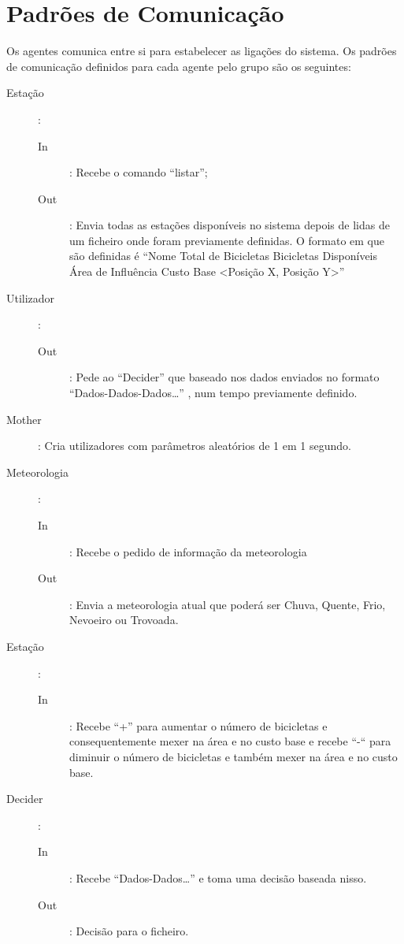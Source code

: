 \section{Padrões de Comunicação}\label{sec:comunicacao}

Os agentes comunica entre si para estabelecer as ligações do sistema. Os padrões de comunicação definidos para cada agente pelo grupo são os seguintes:

\begin{description}
\item [Estação]:
    \begin{description}
	\item[In]: Recebe o comando “listar”;
	\item[Out]: Envia todas as estações disponíveis no sistema depois de lidas de um ficheiro onde foram previamente definidas. O formato em que são definidas é “Nome Total de Bicicletas Bicicletas Disponíveis Área de Influência Custo Base <Posição X, Posição Y>”
	\end{description}

\item [Utilizador]:
    \begin{description}
	\item [Out]: Pede ao “Decider” que baseado nos dados enviados no formato “Dados-Dados-Dados…” , num tempo previamente definido.
	\end{description}

\item [Mother]: Cria utilizadores com parâmetros aleatórios de 1 em 1 segundo.

\item [Meteorologia]:
    \begin{description}
	\item [In]: Recebe o pedido de informação da meteorologia
	\item [Out]: Envia a meteorologia atual que poderá ser Chuva, Quente, Frio, Nevoeiro ou Trovoada.
	\end{description}

\item [Estação]:
    \begin{description}
	\item [In]: Recebe “+” para aumentar o número de bicicletas e consequentemente mexer na área e no custo base e recebe “-“ para diminuir o número de bicicletas e também mexer na área e no custo base.
	\end{description}

\item [Decider]:
    \begin{description}
	\item [In]: Recebe “Dados-Dados…” e toma uma decisão baseada nisso.
	\item [Out]: Decisão para o ficheiro.
	\end{description}
\end{description}